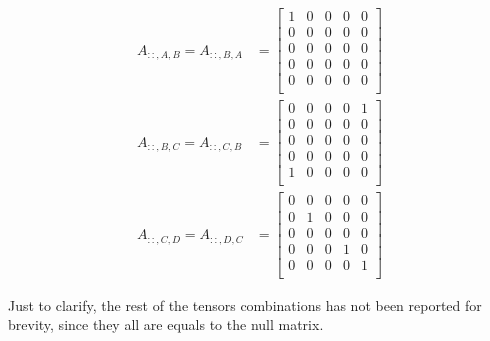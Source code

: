 \documentclass{article}
\begin{document}
\begin{enumerate}[a)]
\begin{align*}
            A_{::,A,B} = A_{::,B,A} &= 
            \begin{bmatrix}
            1 & 0 & 0 & 0 & 0 \\
            0 & 0 & 0 & 0 & 0 \\
            0 & 0 & 0 & 0 & 0 \\
            0 & 0 & 0 & 0 & 0 \\
            0 & 0 & 0 & 0 & 0 \\
            \end{bmatrix}\\
            A_{::,B,C} = A_{::,C,B} &= 
            \begin{bmatrix}
            0 & 0 & 0 & 0 & 1 \\
            0 & 0 & 0 & 0 & 0 \\
            0 & 0 & 0 & 0 & 0 \\
            0 & 0 & 0 & 0 & 0 \\
            1 & 0 & 0 & 0 & 0 \\
            \end{bmatrix}\\
            A_{::,C,D} = A_{::,D,C} &= 
            \begin{bmatrix}
            0 & 0 & 0 & 0 & 0 \\
            0 & 1 & 0 & 0 & 0 \\
            0 & 0 & 0 & 0 & 0 \\
            0 & 0 & 0 & 1 & 0 \\
            0 & 0 & 0 & 0 & 1 \\
            \end{bmatrix} 
        \end{align*}
        
        \noindent Just to clarify, the rest of the tensors combinations has not been reported for brevity, since they all are equals to the null matrix.
        
    \end{enumerate} 
    
\end{document}
